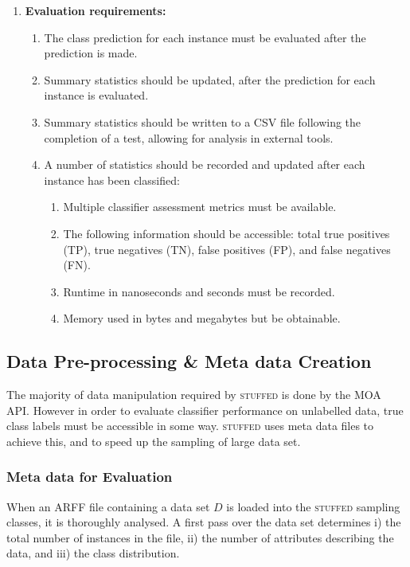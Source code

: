\documentclass[twoside,a4paper]{refart}
\begin{document}
\begin{enumerate}
\item\textbf{Evaluation requirements:}
\begin{enumerate}
\item The class prediction for each instance must be evaluated after the prediction is made.
\item Summary statistics should be updated, after the prediction for each instance is evaluated.
\item Summary statistics should be written to a CSV file following the completion of a test, allowing for analysis in external tools.
\item A number of statistics should be recorded and updated after each instance has been classified:
\begin{enumerate}
\item Multiple classifier assessment metrics must be available.
\item The following information should be accessible: total true positives (TP), true negatives (TN), false positives (FP), and false negatives (FN).
\item Runtime in nanoseconds and seconds must be recorded.
\item Memory used in bytes and megabytes but be obtainable.
\end{enumerate}
\end{enumerate}

\end{enumerate}

\subsection{Data Pre-processing \& Meta data Creation}
\label{sec:stfuddata}
The majority of data manipulation required by \textsc{stuffed} is done by the MOA API. However in order to evaluate classifier performance on unlabelled data, true class labels must be accessible in some way. \textsc{stuffed} uses meta data files to achieve this, and to speed up the sampling of large data set.

\subsubsection{Meta data for Evaluation}
When an ARFF file containing a data set $D$ is loaded into the \textsc{stuffed} sampling classes, it is thoroughly analysed. A first pass over the data set determines i) the total number of instances in the file, ii) the number of attributes describing the data, and iii) the class distribution. 
\end{document}
